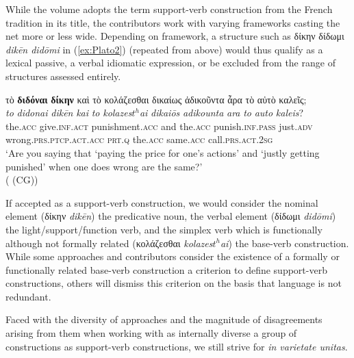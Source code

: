 \documentclass[output=paper,colorlinks,citecolor=brown]{langscibook}
\begin{document}
While the volume adopts the term support-verb construction from the French tradition in its title, the contributors work with varying frameworks casting the net more or less wide. Depending on framework, a structure such as δίκην δίδωμι \textit{dikēn didōmi} in (\ref{ex:Plato2}) (repeated from above) would thus qualify as a lexical passive, a verbal idiomatic expression, or be excluded from the range of structures assessed entirely. 


\ea\label{ex:Plato2}
\glll τὸ \textbf{διδόναι} \textbf{δίκην} καὶ τὸ κολάζεσθαι δικαίως ἀδικοῦντα ἆρα τὸ αὐτὸ καλεῖς; \\ \textit{to} 		\textit{didonai} 	\textit{dikēn} 			\textit{kai} 	\textit{to} \textit{kolazes$t^{h}$ai} 		\textit{dikaiōs} 	\textit{adikounta} 		   \textit{ara} 		\textit{to} \textit{auto} 		         \textit{kaleis}? \\ the.\textsc{acc} 	give.\textsc{inf.act} punishment.\textsc{acc}  and 	the.\textsc{acc} punish.\textsc{inf.pass} 	just.\textsc{adv} 	wrong.\textsc{prs.ptcp.act.acc}  \textsc{prt}.\textsc{q}	the.\textsc{acc} same.\textsc{acc} 	 call.\textsc{prs.act.2sg}\\
\glt `Are you saying that ‘paying the price for one’s actions’ and ‘justly getting punished’ when one does wrong are the same?' \\
\hspace*{\fill}( (CG))
\z


If accepted as a support-verb construction, we would consider the nominal element (δίκην \textit{dikēn}) the predicative noun, the verbal element (δίδωμι \textit{didōmi}) the light/support/function verb, and the simplex verb which is functionally although not formally related (κολάζεσθαι \textit{kolazes$t^{h}$ai}) the base-verb construction. While some approaches and contributors consider the existence of a formally or functionally related base-verb construction a criterion to define support-verb constructions, others will dismiss this criterion on the basis that language is not redundant. 


Faced with the diversity of approaches and the magnitude of disagreements arising from them when working with as internally diverse a group of constructions as support-verb constructions, we still strive for \textit{in varietate unitas}.
\end{document}

